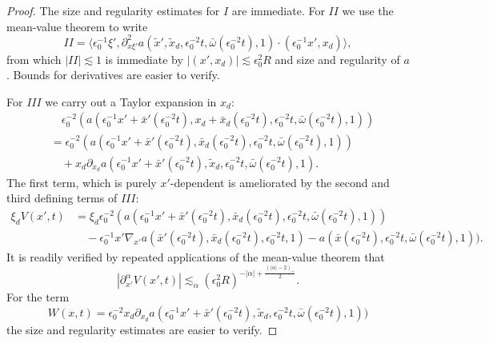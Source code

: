 \documentclass{amsart}
\theoremstyle{definition}
\begin{document}
\begin{proof}
The size and regularity estimates for $I$ are immediate. For $II$ we use the mean-value theorem to write
\begin{equation*}
II = \langle \epsilon_0^{-1} \xi', \partial^2_{x \xi'} a(\tilde{x}',\tilde{x}_d,\epsilon_0^{-2} t, \bar{\omega}(\epsilon_0^{-2} t),1) \cdot (\epsilon_0^{-1} x',x_d)\rangle,
\end{equation*}
from which $|II| \lesssim 1$ is immediate by $|(x',x_d)| \lesssim \epsilon_0^2 R$ and size and regularity of $a$. Bounds for derivatives are easier to verify.

For $III$ we carry out a Taylor expansion in $x_d$:
\begin{equation*}
\begin{split}
&\quad \epsilon_0^{-2} (a(\epsilon_0^{-1} x'+\bar{x}'(\epsilon_0^{-2} t),x_d + \bar{x}_d(\epsilon_0^{-2} t), \epsilon_0^{-2} t,\bar{\omega}(\epsilon_0^{-2} t),1)) \\
&= \epsilon_0^{-2} (a(\epsilon_0^{-1} x' + \bar{x}'(\epsilon_0^{-2} t),\bar{x}_d(\epsilon_0^{-2} t),\epsilon_0^{-2} t, \bar{\omega}(\epsilon_0^{-2} t),1)) \\
&\quad + x_d \partial_{x_d} a(\epsilon_0^{-1} x' + \bar{x}'(\epsilon_0^{-2} t),\tilde{x}_d,\epsilon_0^{-2} t, \bar{\omega}(\epsilon_0^{-2} t),1).
\end{split}
\end{equation*}
The first term, which is purely $x'$-dependent is ameliorated by the second and third defining terms of $III$:
\begin{equation*}
\begin{split}
\xi_d V(x',t) &= \xi_d \epsilon_0^{-2} ( a(\epsilon_0^{-1} x' + \bar{x}'(\epsilon_0^{-2} t),\bar{x}_d(\epsilon_0^{-2} t),\epsilon_0^{-2} t, \bar{\omega}(\epsilon_0^{-2} t),1)) \\
&\quad - \epsilon_0^{-1} x' \nabla_{x'} a(\bar{x}'(\epsilon_0^{-2} t),\bar{x}_d(\epsilon_0^{-2} t),\epsilon_0^{-2} t,1) - a(\bar{x}(\epsilon_0^{-2} t),\epsilon_0^{-2} t, \bar{\omega}(\epsilon_0^{-2} t),1)).
\end{split}
\end{equation*}
It is readily verified by repeated applications of the mean-value theorem that
\begin{equation*}
|\partial_{x'}^{\alpha} V(x',t)| \lesssim_\alpha (\epsilon_0^2 R)^{-|\alpha| + \frac{(|\alpha|-2)_+}{2}}.
\end{equation*}
For the term
\begin{equation*}
W(x,t) = \epsilon_0^{-2} x_d \partial_{x_d} a(\epsilon_0^{-1} x' + \bar{x}'(\epsilon_0^{-2} t), \tilde{x}_d, \epsilon_0^{-2} t, \bar{\omega}(\epsilon_0^{-2} t),1))
\end{equation*}
the size and regularity estimates are easier to verify.
\end{proof}
\end{document}
